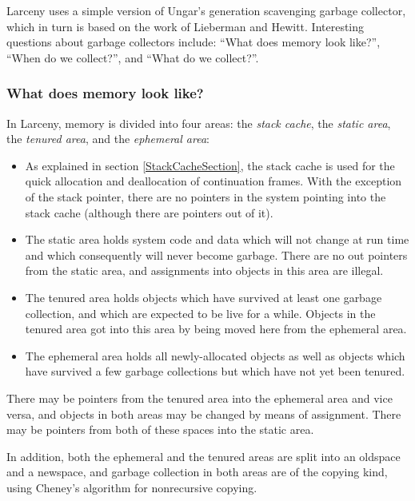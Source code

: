 Larceny uses a simple version of Ungar's generation scavenging garbage
collector\cite{Ungar:gsgc}, which in turn is based on the work of Lieberman
and Hewitt\cite{LiebermanHewitt}. Interesting questions about garbage
collectors include: ``What does memory look like?'', ``When do we
collect?'', and ``What do we collect?''.

\subsubsection{What does memory look like?}

In Larceny, memory is divided into four areas: the {\em stack cache}, 
the {\em static area}, the {\em tenured area}, and the {\em ephemeral area}:
\begin{itemize}
\item
As explained in section \ref{StackCacheSection}, the stack cache is used for
the quick allocation and deallocation of continuation frames. With the
exception of the stack pointer, there are no pointers in the system pointing
into the stack cache (although there are pointers out of it).

\item
The static area holds system code and data which will not change at run time
and which consequently will never become garbage. There are no out pointers
from the static area, and assignments into objects in this area are illegal.

\item
The tenured area holds objects which have survived at least one garbage
collection, and which are expected to be live for a while. Objects in
the tenured area got into this area by being moved here from the ephemeral
area.

\item
The ephemeral area holds all newly-allocated objects as well as objects
which have survived a few garbage collections but which have not yet been
tenured.
\end{itemize}

There may be pointers from the tenured area into the ephemeral area and vice
versa, and objects in both areas may be changed by means of assignment.
There may be pointers from both of these spaces into the static area.

In addition, both the ephemeral and the tenured areas are split into an
oldspace and a newspace, and garbage collection in both areas are of the
copying kind, using Cheney's algorithm \cite{Cheney} for nonrecursive
copying.

